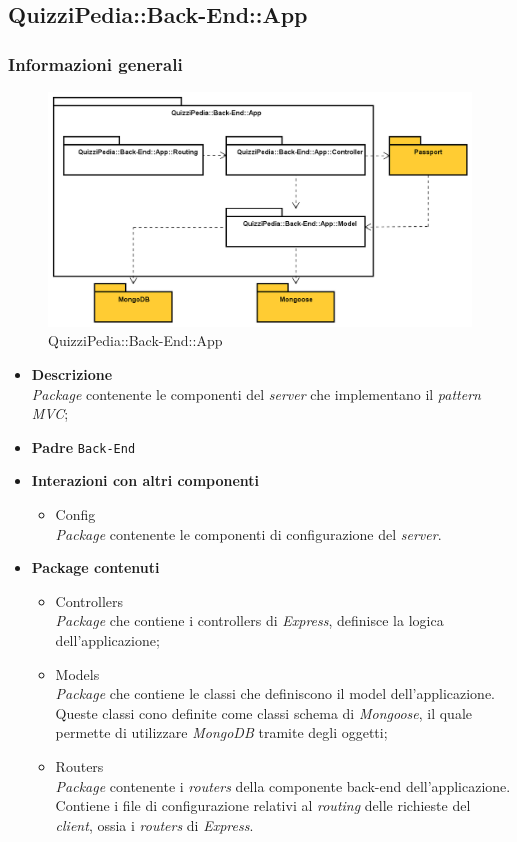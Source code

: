 \subsection{QuizziPedia::Back-End::App}
\subsubsection{Informazioni generali}
\label{QuizziPedia::Back-End::App}
\begin{figure}[ht]
	\centering
	\includegraphics[scale=0.45]{UML/Package/QuizziPedia_Back-End_App.png}
	\caption{QuizziPedia::Back-End::App}
\end{figure}
\FloatBarrier
	\begin{itemize}
		\item \textbf{Descrizione} \\
		\textit{Package} contenente le componenti del \textit{server} che implementano il \textit{pattern\ped{G} MVC};
		\item \textbf{Padre} \texttt{Back-End}
		\item \textbf{Interazioni con altri componenti}
			\begin{itemize}
				\item Config \\
				\textit{Package} contenente le componenti di configurazione del \textit{server}.
			\end{itemize}
		\item \textbf{Package contenuti}
			\begin{itemize}
				\item Controllers \\
				\textit{Package} che contiene i controllers di \textit{Express}, definisce la logica dell'applicazione;
				\item Models \\
				\textit{Package} che contiene le classi che definiscono il model dell'applicazione. Queste classi cono definite come classi schema di \textit{Mongoose}, il quale permette di utilizzare \textit{MongoDB} tramite degli oggetti;
				\item Routers \\
				\textit{Package} contenente i \textit{routers} della componente back-end dell'applicazione. Contiene i file di configurazione relativi al \textit{routing} delle richieste del \textit{client}, ossia i \textit{routers} di \textit{Express}.
			\end{itemize}
	\end{itemize}